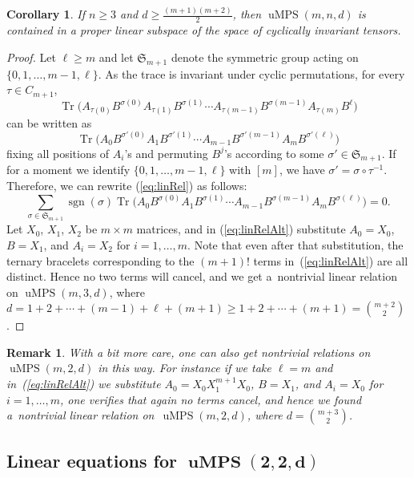 \documentclass[10pt,a4paper]{amsart}
\numberwithin{equation}{section}
\newtheorem{Corollary}[Theorem]{Corollary}
\newtheorem{Remark}[Theorem]{Remark}
\DeclareMathOperator{\Tr}{Tr}
\DeclareMathOperator{\sgn}{sgn}
\newcommand{\SG}{\mathfrak{S}}
\DeclareMathOperator{\uMPS}{uMPS}
\begin{document}
\begin{Corollary}\label{cor: lin span}
	If $n \geq 3$ and $d \geq \frac{(m+1)(m+2)}{2}$, then ${\uMPS(m,n,d)}$ is contained in a proper linear subspace of the space of cyclically invariant tensors.
\end{Corollary}
\begin{proof}
Let $\ell \geq m$ and let $\SG_{m+1}$ denote the symmetric group acting on $\{0,1,\dots,m-1,\ell\}$. As the trace is invariant under cyclic permutations, for every $\tau \in C_{m+1}$, \[\Tr\big(A_{\tau(0)}B^{\sigma(0)}A_{\tau(1)}B^{\sigma(1)} \cdots A_{\tau(m-1)}B^{\sigma(m-1)}A_{\tau(m)}B^{\ell}\big)\] can be written as \[\Tr\big(A_{0}B^{\sigma'(0)}A_{1}B^{\sigma'(1)} \cdots A_{m-1}B^{\sigma'(m-1)}A_{m}B^{\sigma'(\ell)}\big)\] fixing all positions of $A_i$'s and permuting $B^j$'s according to some $\sigma' \in \mathfrak{S}_{m+1}$. If for a moment we identify $\{0,1,\dots,m-1,\ell\}$ with $[m]$, we have $\sigma'=\sigma \circ \tau^{-1}$. Therefore, we can rewrite (\ref{eq:linRel}) as follows:
\begin{equation} \label{eq:linRelAlt}
	\sum_{\sigma \in \mathfrak{S}_{m+1}}{\sgn(\sigma)\Tr\big(A_{0}B^{\sigma(0)}A_{1}B^{\sigma(1)} \cdots A_{m-1}B^{\sigma(m-1)}A_{m}B^{\sigma(\ell)}\big)}=0.
\end{equation}
Let $X_0$, $X_1$, $X_2$ be $m \times m$ matrices, and in (\ref{eq:linRelAlt}) substitute $A_0=X_0$, $B=X_1$, and $A_i = X_2$ for $i=1,\dots,m$. Note that even after that substitution, the ternary bracelets corresponding to the $(m+1)!$ terms in~(\ref{eq:linRelAlt}) are all distinct. Hence no two terms will cancel, and we get a~nontrivial linear relation on $\uMPS(m,3,d)$, where $d=1+2+\cdots+(m-1)+ \ell + (m+1) \geq 1+2+\cdots+ (m+1) = \binom{m+2}{2}$.
\end{proof}

\begin{Remark}
With a bit more care, one can also get nontrivial relations on $\uMPS(m,2,d)$ in this way. For instance if we take $\ell=m$ and in~(\ref{eq:linRelAlt}) we substitute $A_0=X_0X_1^{m+1}X_0$, $B=X_1$, and $A_i = X_0$ for $i=1,\dots,m$, one verifies that again no terms cancel, and hence we found a~nontrivial linear relation on~$\uMPS(m,2,d)$, where $d=\binom{m+3}{2}$.
\end{Remark}

\subsection[Linear equations for uMPS(2,2,d)]{Linear equations for $\boldsymbol{\uMPS(2,2,d)}$} \label{sec:lineq22d}
\end{document}
